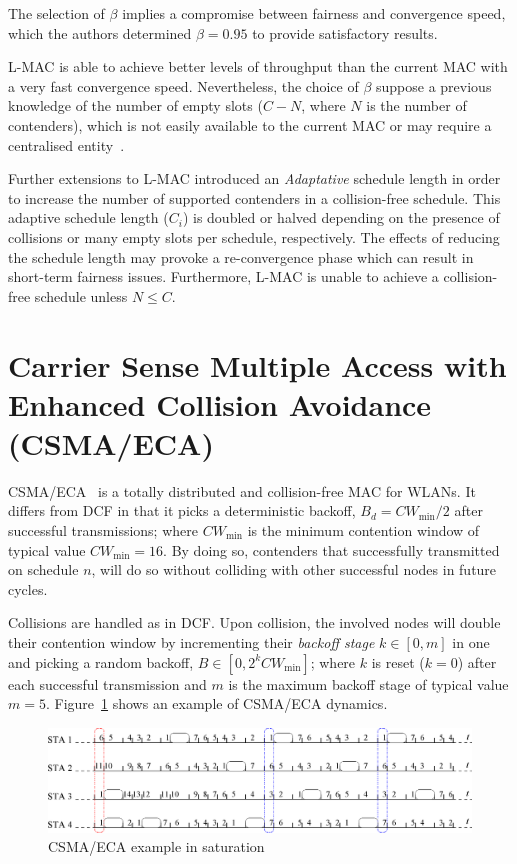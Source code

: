 \documentclass[a4paper,journal]{IEEEtran}
\begin{document}
The selection of $\beta$ implies a compromise between fairness and convergence speed, which the authors determined $\beta=0.95$ to provide satisfactory results.

L-MAC is able to achieve better levels of throughput than the current MAC with a very fast convergence speed. Nevertheless, the choice of $\beta$ suppose a previous knowledge of the number of empty slots ($C-N$, where $N$ is the number of contenders), which is not easily available to the current MAC or may require a centralised entity~\cite{barcelo2011tcf}.

Further extensions to L-MAC introduced an \emph{Adaptative} schedule length in order to increase the number of supported contenders in a collision-free schedule. This adaptive schedule length ($C_{i}$) is doubled or halved depending on the presence of collisions or many empty slots per schedule, respectively. The effects of reducing the schedule length may provoke a re-convergence phase which can result in short-term fairness issues. Furthermore, L-MAC is unable to achieve a collision-free schedule unless $N\leq C$.

\section{Carrier Sense Multiple Access with Enhanced Collision Avoidance (CSMA/ECA)}\label{introProtocol}
CSMA/ECA~\cite{barcelo2008lba} is a totally distributed and collision-free MAC for WLANs. It differs from DCF in that it picks a deterministic backoff, $B_{d}=CW_{\min}/2$ after successful transmissions; where $CW_{\min}$ is the minimum contention window of typical value $CW_{\min}=16$. By doing so, contenders that successfully transmitted on schedule $n$, will do so without colliding with other successful nodes in future cycles.

Collisions are handled as in DCF. Upon collision, the involved nodes will double their contention window by incrementing their \emph{backoff stage} $k\in[0,m]$ in one and picking a random backoff, $B\in[0,2^{k}CW_{\min}]$; where $k$ is reset ($k=0$) after each successful transmission and $m$ is the maximum backoff stage of typical value $m=5$. Figure~\ref{fig:BECA} shows an example of CSMA/ECA dynamics.

\begin{figure}[tbhp]
\centering
  \includegraphics[width=0.8\linewidth]{figures/basicECA.eps}
  \caption{CSMA/ECA example in saturation}
  \label{fig:BECA}
\end{figure}
\end{document}
